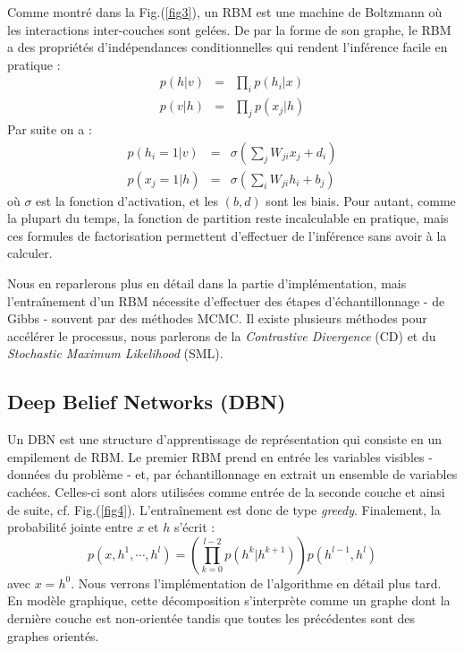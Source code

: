 \documentclass[10pt,a4paper]{article}
\begin{document}
Comme montré dans la Fig.(\ref{fig3}), un RBM est une machine de Boltzmann où les interactions inter-couches sont gelées. De par la forme de son graphe, le RBM a des propriétés d'indépendances conditionnelles qui rendent l'inférence facile en pratique : 
\begin{equation}
\begin{array}{rll}
p(h|v) & = & \displaystyle \prod_{i} p(h_i|x) \\
p(v|h) & = & \displaystyle \prod_{j} p(x_j|h)
\end{array}
\end{equation}
Par suite on a : 
\begin{equation}
\begin{array}{rll}
p(h_i = 1 |v ) & = & \displaystyle \sigma\left(\sum_j W_{ji}x_j + d_i\right) \\
p(x_j = 1 |h ) & = & \displaystyle \sigma\left(\sum_i W_{ji}h_i + b_j\right)
\end{array}
\end{equation}
où $\sigma$ est la fonction d'activation, et les $(b,d)$ sont les biais. Pour autant, comme la plupart du temps, la fonction de partition reste incalculable en pratique, mais ces formules de factorisation permettent d'effectuer de l'inférence sans avoir à la calculer.

Nous en reparlerons plus en détail dans la partie d'implémentation, mais l'entraînement d'un RBM nécessite d'effectuer des étapes d'échantillonnage - de Gibbs - souvent par des méthodes MCMC. Il existe plusieurs méthodes pour accélérer le processus, nous parlerons de la \emph{Contrastive Divergence} (CD) et du \emph{Stochastic Maximum Likelihood} (SML).

%

\subsection{Deep Belief Networks (DBN)}

Un DBN est une structure d'apprentissage de représentation qui consiste en un empilement de RBM. Le premier RBM prend en entrée les variables visibles - données du problème - et, par échantillonnage en extrait un ensemble de variables cachées. Celles-ci sont alors utilisées comme entrée de la seconde couche et ainsi de suite, cf. Fig.(\ref{fig4}). L'entraînement est donc de type \emph{greedy}. Finalement, la probabilité jointe entre $x$ et $h$ s'écrit :
\begin{equation}
p(x, h^1, \cdots, h^l) = \left( \prod_{k=0}^{l-2} p(h^k |h^{k+1}) \right) p(h^{l-1}, h^l)
\end{equation}
avec $x=h^0$. Nous verrons l'implémentation de l'algorithme en détail plus tard. En modèle graphique, cette décomposition s'interprète comme un graphe dont la dernière couche est non-orientée tandis que toutes les précédentes sont des graphes orientés.
\end{document}
